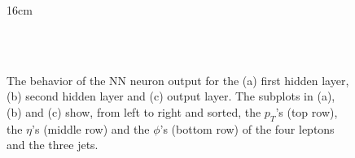 \begin{figure}[htbp]{16cm}
	\caption{The behavior of the NN neuron output for the (a) first hidden layer, (b) second hidden layer and (c) output layer. The subplots in (a), (b) and (c) show, from left to right and sorted, the $p_{T}$'s (top row), the $\eta$'s (middle row) and the $\phi$'s (bottom row) of the four leptons and the three jets.}
	\centering
	\\
	\\
	\label{fig:nn_features}
\end{figure}	
